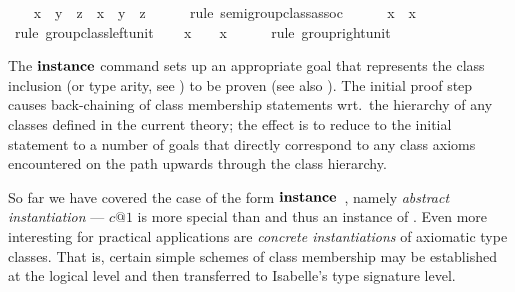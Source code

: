 \begin{isabellebody}
\ \ \isamarkupfalse%
\ {\isachardoublequoteopen}x\ {\isasymodot}\ y\ {\isasymodot}\ z\ {\isacharequal}\ x\ {\isasymodot}\ {\isacharparenleft}y\ {\isasymodot}\ z{\isacharparenright}{\isachardoublequoteclose}\isanewline
\ \ \ \ \isamarkupfalse%
\ {\isacharparenleft}rule\ semigroup{\isacharunderscore}class{\isachardot}assoc{\isacharparenright}\isanewline
\ \ \isamarkupfalse%
\ {\isachardoublequoteopen}{\isasymone}\ {\isasymodot}\ x\ {\isacharequal}\ x{\isachardoublequoteclose}\isanewline
\ \ \ \ \isamarkupfalse%
\ {\isacharparenleft}rule\ group{\isacharunderscore}class{\isachardot}left{\isacharunderscore}unit{\isacharparenright}\isanewline
\ \ \isamarkupfalse%
\ {\isachardoublequoteopen}x\ {\isasymodot}\ {\isasymone}\ {\isacharequal}\ x{\isachardoublequoteclose}\isanewline
\ \ \ \ \isamarkupfalse%
\ {\isacharparenleft}rule\ group{\isacharunderscore}right{\isacharunderscore}unit{\isacharparenright}\isanewline
{}\isamarkupfalse%
%
\endisatagproof
{\isafoldproof}%
%
\isadelimproof
%
\endisadelimproof
%
\begin{isamarkuptext}%
\medskip The ${\mathord{\mathbf{instance}}}$ command sets up an appropriate goal that
  represents the class inclusion (or type arity, see
  ) to be proven (see also
  \cite{isabelle-isar-ref}).  The initial proof step causes
  back-chaining of class membership statements wrt.\ the hierarchy of
  any classes defined in the current theory; the effect is to reduce
  to the initial statement to a number of goals that directly
  correspond to any class axioms encountered on the path upwards
  through the class hierarchy.%
\end{isamarkuptext}%
\isamarkuptrue%
%
\isamarkuptrue%
%
\begin{isamarkuptext}%
So far we have covered the case of the form ${\mathord{\mathbf{instance}}}$~, namely \emph{abstract instantiation} ---
  $c@1$ is more special than  and thus an instance
  of .  Even more interesting for practical
  applications are \emph{concrete instantiations} of axiomatic type
  classes.  That is, certain simple schemes  of class membership may be established at the
  logical level and then transferred to Isabelle's type signature
  level.


\end{isamarkuptext}
\end{isabellebody}
